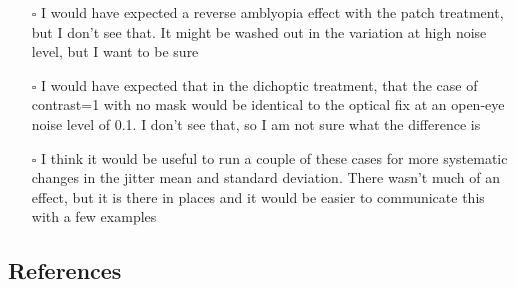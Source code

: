 \documentclass[
  sn-apa,
  pdflatex]{sn-jnl}
\theoremstyle{thmstyleone}%
\theoremstyle{thmstyletwo}%
\theoremstyle{thmstylethree}%
\providecommand{\tightlist}{%
  \setlength{\itemsep}{0pt}\setlength{\parskip}{0pt}}
\begin{document}
\begin{itemize}
\tightlist
\item[$\square$]
  I would have expected a reverse amblyopia effect with the patch
  treatment, but I don't see that. It might be washed out in the
  variation at high noise level, but I want to be sure
\item[$\square$]
  I would have expected that in the dichoptic treatment, that the case
  of contrast=1 with no mask would be identical to the optical fix at an
  open-eye noise level of 0.1. I don't see that, so I am not sure what
  the difference is
\item[$\square$]
  I think it would be useful to run a couple of these cases for more
  systematic changes in the jitter mean and standard deviation. There
  wasn't much of an effect, but it is there in places and it would be
  easier to communicate this with a few examples
\end{itemize}

\hypertarget{references}{%
\subsection*{References}\label{references}}
\end{document}
